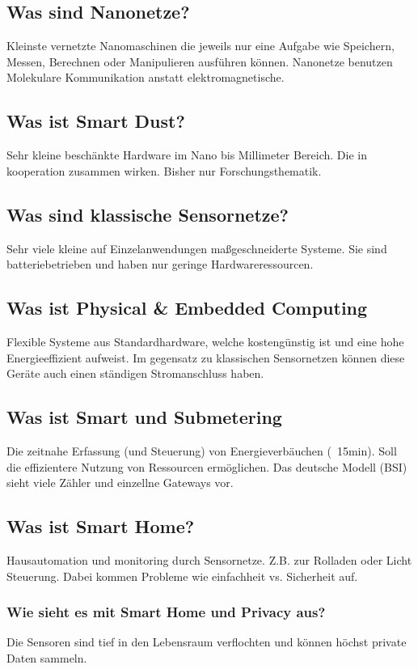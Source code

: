 	\subsection{Was sind Nanonetze?}
	Kleinste vernetzte Nanomaschinen die jeweils nur eine Aufgabe wie Speichern, Messen, Berechnen oder Manipulieren ausführen können. Nanonetze benutzen Molekulare Kommunikation anstatt elektromagnetische.
	
	\subsection{Was ist Smart Dust?}
	Sehr kleine beschänkte Hardware im Nano bis Millimeter Bereich. Die in kooperation zusammen wirken. Bisher nur Forschungsthematik. 
	
	\subsection{Was sind klassische Sensornetze?}
	Sehr viele kleine auf Einzelanwendungen maßgeschneiderte Systeme. Sie sind batteriebetrieben und haben nur geringe Hardwareressourcen.
	
	\subsection{Was ist Physical \& Embedded Computing}
	Flexible Systeme aus Standardhardware, welche kostengünstig ist und eine hohe Energieeffizient aufweist. Im gegensatz zu klassischen Sensornetzen können diese Geräte auch einen ständigen Stromanschluss haben.
	
	\subsection{Was ist Smart\- und Submetering}
	Die zeitnahe Erfassung (und Steuerung) von Energieverbäuchen (~15min). Soll die effizientere Nutzung von Ressourcen ermöglichen. Das deutsche Modell (BSI) sieht viele Zähler und einzellne Gateways vor. 
	
	\subsection{Was ist Smart Home?}
	Hausautomation und monitoring durch Sensornetze. 
	Z.B. zur Rolladen oder Licht Steuerung.
	Dabei kommen Probleme wie einfachheit vs. Sicherheit auf. 
	\subsubsection{Wie sieht es mit Smart Home und Privacy aus?}
	Die Sensoren sind tief in den Lebensraum verflochten und können höchst private Daten sammeln.
